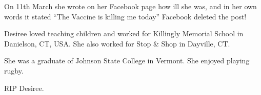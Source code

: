 On 11th March she wrote on her Facebook page how ill she was, and in her own
words it stated “The Vaccine is killing me today” Facebook deleted the post!

Desiree loved teaching children and worked for Killingly Memorial School in
Danielson, CT, USA. She also worked for Stop \& Shop in Dayville, CT.

She was a graduate of Johnson State College in Vermont. She enjoyed playing
rugby.

RIP Desiree.

